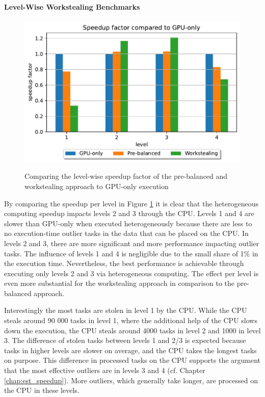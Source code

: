 \paragraph{Level-Wise Workstealing Benchmarks}
\begin{figure}[H]
  \caption{Comparing the level-wise speedup factor of the pre-balanced and workstealing approach to GPU-only execution}
  \includegraphics[width=\textwidth]{figures/levelwise.pdf}
  \centering
  \label{fig:levelwise_delos}
\end{figure}

By comparing the speedup per level in Figure \ref{fig:levelwise_delos} it is clear that the heterogeneous computing speedup impacts levels 2 and 3 through the CPU. Levels 1 and 4 are slower than GPU-only when executed heterogeneously because there are less to no execution-time outlier tasks in the data that can be placed on the CPU. In levels 2 and 3, there are more significant and more performance impacting outlier tasks. The influence of levels 1 and 4 is negligible due to the small share of 1\% in the execution time. Nevertheless, the best performance is achievable through executing only levels 2 and 3 via heterogeneous computing. The effect per level is even more substantial for the workstealing approach in comparison to the pre-balanced approach.

Interestingly the most tasks are stolen in level 1 by the CPU. While the CPU steals around 90 000 tasks in level 1, where the additional help of the CPU slows down the execution, the CPU steals around 4000 tasks in level 2 and 1000 in level 3. The difference of stolen tasks between levels 1 and 2/3 is expected because tasks in higher levels are slower on average, and the CPU takes the longest tasks on purpose. This difference in processed tasks on the CPU supports the argument that the most effective outliers are in levels 3 and 4 (cf. Chapter \ref{chap:est_speedup}). More outliers, which generally take longer, are processed on the CPU in these levels.

